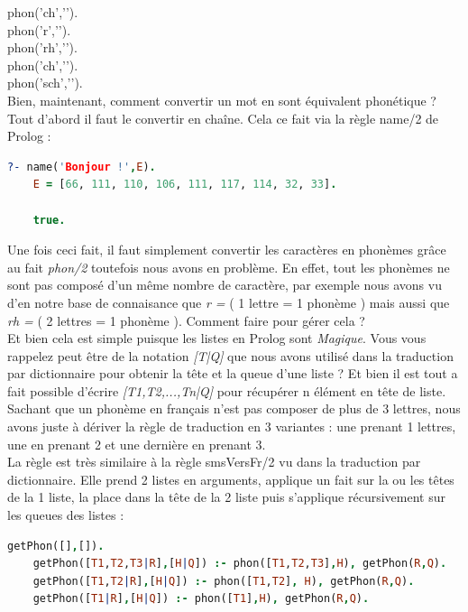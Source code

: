\documentclass[11pt]{report}
\begin{document}
	\indent phon('ch','').\\
	\indent phon('r','').\\
	\indent phon('rh','').\\
	\indent phon('ch','').\\
	\indent phon('sch','').\\
	
	Bien, maintenant, comment convertir un mot en sont équivalent phonétique ? Tout d'abord il faut le convertir en chaîne. Cela ce fait via la règle name/2 de Prolog :
	
	\begin{lstlisting}[language=Prolog]
	?- name('Bonjour !',E). 
	E = [66, 111, 110, 106, 111, 117, 114, 32, 33].
	
	true.
	\end{lstlisting}
	
	Une fois ceci fait, il faut simplement convertir les caractères en phonèmes grâce au fait {\em phon/2} toutefois nous avons en problème. En effet, tout les phonèmes ne sont pas composé d'un même nombre de caractère, par exemple nous avons vu d'en notre base de connaisance que {\em r = } ( 1 lettre = 1 phonème ) mais aussi que {\em rh = } ( 2 lettres = 1 phonème ). Comment faire pour gérer cela ?\\
	Et bien cela est simple puisque les listes en Prolog sont {\em Magique}. Vous vous rappelez peut être de la notation {\em [T|Q]} que nous avons utilisé dans la traduction par dictionnaire pour obtenir la tête et la queue d'une liste ? Et bien il est tout a fait possible d'écrire {\em [T1,T2,...,Tn|Q]} pour récupérer n élément en tête de liste.\\
	Sachant que un phonème en français n'est pas composer de plus de 3 lettres, nous avons juste à dériver la règle de traduction en 3 variantes : une prenant 1 lettres, une en prenant 2 et une dernière en prenant 3.\\ 
	La règle est très similaire à la règle smsVersFr/2 vu dans la traduction par dictionnaire. Elle prend 2 listes en arguments, applique un fait sur la ou les têtes de la 1 liste, la place dans la tête de la 2 liste puis s'applique récursivement sur les queues des listes :
	
	\begin{lstlisting}[language=Prolog]
	getPhon([],[]).
	getPhon([T1,T2,T3|R],[H|Q]) :- phon([T1,T2,T3],H), getPhon(R,Q).
	getPhon([T1,T2|R],[H|Q]) :- phon([T1,T2], H), getPhon(R,Q).
	getPhon([T1|R],[H|Q]) :- phon([T1],H), getPhon(R,Q).
	\end{lstlisting}
	
\end{document}
